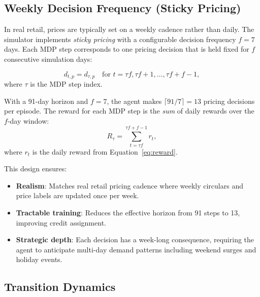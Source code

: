 \documentclass[11pt,a4paper]{article}
\begin{document}
\subsection{Weekly Decision Frequency (Sticky Pricing)}

In real retail, prices are typically set on a weekly cadence rather than daily.
The simulator implements \emph{sticky pricing} with a configurable decision frequency $f = 7$ days.
Each MDP step corresponds to one pricing decision that is held fixed for $f$ consecutive simulation days:

\begin{equation}
d_{t, p} = d_{\tau, p} \quad \text{for } t = \tau f, \tau f + 1, \ldots, \tau f + f - 1,
\end{equation}
where $\tau$ is the MDP step index.

With a 91-day horizon and $f = 7$, the agent makes $\lceil 91 / 7 \rceil = 13$ pricing decisions per episode.
The reward for each MDP step is the \emph{sum} of daily rewards over the $f$-day window:
\begin{equation}
R_\tau = \sum_{t=\tau f}^{\tau f + f - 1} r_t,
\end{equation}
where $r_t$ is the daily reward from Equation~\eqref{eq:reward}.

This design ensures:
\begin{itemize}
    \item \textbf{Realism}: Matches real retail pricing cadence where weekly circulars and price labels are updated once per week.
    \item \textbf{Tractable training}: Reduces the effective horizon from 91 steps to 13, improving credit assignment.
    \item \textbf{Strategic depth}: Each decision has a week-long consequence, requiring the agent to anticipate multi-day demand patterns including weekend surges and holiday events.
\end{itemize}

\subsection{Transition Dynamics}
\end{document}
